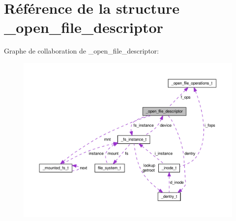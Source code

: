 \hypertarget{struct__open__file__descriptor}{\section{Référence de la structure \-\_\-open\-\_\-file\-\_\-descriptor}
\label{struct__open__file__descriptor}
}


Graphe de collaboration de \-\_\-open\-\_\-file\-\_\-descriptor\-:
\nopagebreak
\begin{figure}[H]
\begin{center}
\leavevmode
\includegraphics[width=350pt]{struct__open__file__descriptor__coll__graph}
\end{center}
\end{figure}
